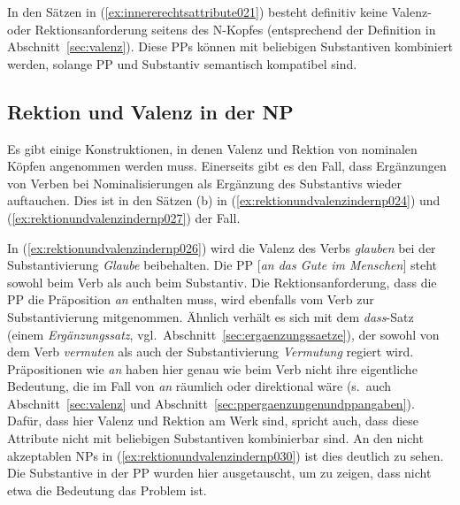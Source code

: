 In den Sätzen in (\ref{ex:innererechtsattribute021}) besteht definitiv keine Valenz- oder Rektionsanforderung seitens des N-Kopfes (entsprechend der Definition in Abschnitt~\ref{sec:valenz}).
Diese PPs können mit beliebigen Substantiven kombiniert werden, solange PP und Substantiv semantisch kompatibel sind.

\subsection{Rektion und Valenz in der NP}
\label{sec:rektionundvalenzindernp}


Es gibt einige Konstruktionen, in denen Valenz und Rektion von nominalen Köpfen angenommen werden muss.
Einerseits gibt es den Fall, dass Ergänzungen von Verben bei Nominalisierungen als Ergänzung des Substantivs wieder auftauchen.
Dies ist in den Sätzen (b) in (\ref{ex:rektionundvalenzindernp024}) und (\ref{ex:rektionundvalenzindernp027}) der Fall.

\begin{exe}
  \ex\label{ex:rektionundvalenzindernp024}
  \begin{xlist}
  \end{xlist}
  \ex\label{ex:rektionundvalenzindernp027}
  \begin{xlist}
  \end{xlist}
\end{exe}

In (\ref{ex:rektionundvalenzindernp026}) wird die Valenz des Verbs \textit{glauben} bei der Substantivierung \textit{Glaube} beibehalten.
Die PP [\textit{an das Gute im Menschen}] steht sowohl beim Verb als auch beim Substantiv.
Die Rektionsanforderung, dass die PP die Präposition \textit{an} enthalten muss, wird ebenfalls vom Verb zur Substantivierung mitgenommen.
Ähnlich verhält es sich mit dem \textit{dass}-Satz (einem \textit{Ergänzungssatz}, vgl.\ Abschnitt~\ref{sec:ergaenzungssaetze}), der sowohl von dem Verb \textit{vermuten} als auch der Substantivierung \textit{Vermutung} regiert wird.
Präpositionen wie \textit{an} haben hier genau wie beim Verb nicht ihre eigentliche Bedeutung, die im Fall von \textit{an} räumlich oder direktional wäre (s.\ auch Abschnitt~\ref{sec:valenz} und Abschnitt~\ref{sec:ppergaenzungenundppangaben}).
Dafür, dass hier Valenz und Rektion am Werk sind, spricht auch, dass diese Attribute nicht mit beliebigen Substantiven kombinierbar sind.
An den nicht akzeptablen NPs in (\ref{ex:rektionundvalenzindernp030}) ist dies deutlich zu sehen.
Die Substantive in der PP wurden hier ausgetauscht, um zu zeigen, dass nicht etwa die Bedeutung das Problem ist.


